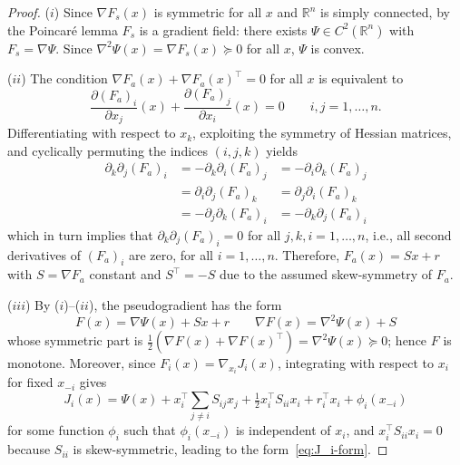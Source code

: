 \documentclass[10pt,a4paper]{amsart}
\newcommand{\rr}{\mathbb{R}}
\begin{document}
\begin{proof}
($i$) Since $\nabla F_s(x)$ is symmetric for all $x$ and $\rr^n$ is
simply connected, by the Poincar\'e lemma $F_s$ is a gradient field:
there exists $\Psi\in C^2(\rr^n)$ with $F_s=\nabla\Psi$. Since
$\nabla^2\Psi(x)=\nabla F_s(x)\succeq0$ for all $x$, $\Psi$ is convex.

($ii$) The condition $\nabla F_a(x)+\nabla F_a(x)^\top=0$ for all $x$ is equivalent to
\begin{equation}
\frac{\partial (F_a)_i}{\partial x_j}(x)
+\frac{\partial (F_a)_j}{\partial x_i}(x)=0
\qquad i,j=1,\ldots,n.
\label{eq:Killing}
\end{equation}
Differentiating with respect to $x_k$,
exploiting the symmetry of Hessian matrices,
and cyclically permuting the indices
$(i,j,k)$ yields
\[
\begin{aligned}
\partial_k\partial_j (F_a)_i 
&=-\partial_k\partial_i (F_a)_j 
&=-\partial_i\partial_k (F_a)_j\\
&=\partial_i\partial_j (F_a)_k 
&=\partial_j\partial_i (F_a)_k \\
&=-\partial_j\partial_k (F_a)_i & = -\partial_k\partial_j (F_a)_i
\end{aligned}
\]
which in turn implies that $\partial_k\partial_j (F_a)_i=0$ for all $j,k,i=1,\ldots,n$, i.e., all second derivatives of $(F_a)_i$ are zero, for all $i=1,\ldots,n$.
Therefore, $F_a(x)=Sx+r$ with $S=\nabla F_a$ constant and $S^\top=-S$ due to the assumed skew-symmetry of $F_a$.

($iii$) By ($i$)--($ii$), the pseudogradient has the form
\[
F(x)=\nabla\Psi(x)+Sx+r
\qquad
\nabla F(x)=\nabla^2\Psi(x)+S
\]
whose symmetric part is $\tfrac{1}{2}(\nabla F(x)+\nabla F(x)^\top)=\nabla^2\Psi(x)\succeq0$; hence $F$ is monotone.
Moreover, since $F_i(x)=\nabla_{x_i}J_i(x)$, integrating with respect to
$x_i$ for fixed $x_{-i}$ gives
\[
J_i(x)
=\Psi(x)+x_i^\top\sum_{j\neq i}S_{ij}x_j
+\tfrac12x_i^\top S_{ii}x_i+r_i^\top x_i+\phi_i(x_{-i})
\]
for some function $\phi_i$ such that $\phi_i(x_{-i})$ is independent of $x_i$, and $x_i^\top S_{ii}x_i=0$ because $S_{ii}$ is skew-symmetric, leading to the form~\eqref{eq:J_i-form}.
\end{proof}
\end{document}
